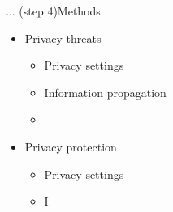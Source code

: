 \begin{frame}{... (step 4)}{Methods}
	\begin{itemize}
		\item Privacy threats
			\begin{itemize}
				\item Privacy settings
				\item Information propagation
				\item 
			\end{itemize}
		\item Privacy protection
			\begin{itemize}
				\item Privacy settings
				\item I
			\end{itemize}
	\end{itemize}
\end{frame}


